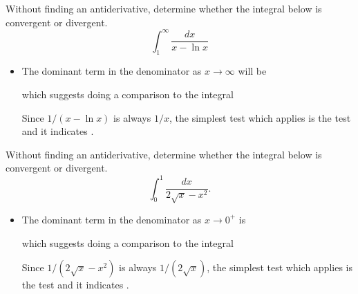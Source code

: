 \documentclass{ximera}
\begin{document}
\begin{example}
Without finding an antiderivative, determine whether the integral below is convergent or divergent.
\[ \int_1^\infty \frac{dx}{x - \ln x} \]
\begin{itemize}
\item The dominant term in the denominator as $x \rightarrow \infty$ will be 
\begin{multipleChoice}
\end{multipleChoice}
which suggests doing a comparison to the integral
\begin{multipleChoice}
\end{multipleChoice}
Since $1/(x- \ln x)$ is always  $1/x$, the simplest test which applies is the  test and it indicates .
\end{itemize}
\end{example}

\begin{example}
Without finding an antiderivative, determine whether the integral below is convergent or divergent.
\[ \int_0^1 \frac{dx}{2\sqrt{x} - x^2}. \]
\begin{itemize}
\item The dominant term in the denominator as $x \rightarrow 0^+$ is
\begin{multipleChoice}
\end{multipleChoice}
which suggests doing a comparison to the integral
\begin{multipleChoice}
\end{multipleChoice}
Since $1/(2 \sqrt{x} -x^2)$ is always  $1/(2 \sqrt{x})$, the simplest test which applies is the  test and it indicates .
\end{itemize}
\end{example}
\end{document}
